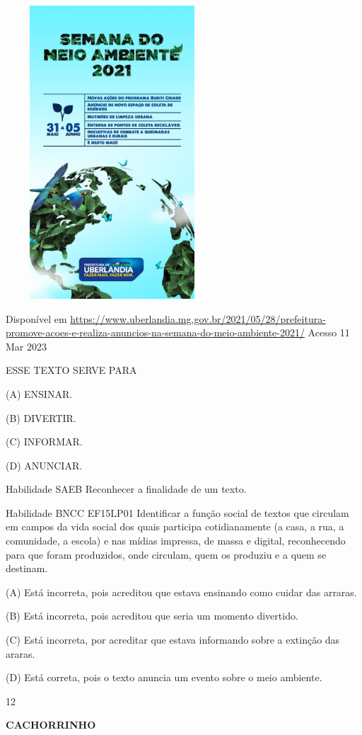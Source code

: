 {{{{{{\includegraphics[width=3.12674in,height=4.31210in]{media/image145.jpeg}

Disponível em
\url{https://www.uberlandia.mg.gov.br/2021/05/28/prefeitura-promove-acoes-e-realiza-anuncios-na-semana-do-meio-ambiente-2021/}
Acesso 11 Mar 2023

ESSE TEXTO SERVE PARA

(A) ENSINAR.

(B) DIVERTIR.

(C) INFORMAR.

(D) ANUNCIAR.

Habilidade SAEB Reconhecer a finalidade de um texto.

Habilidade BNCC EF15LP01 Identificar a função social de textos que
circulam em campos da vida social dos quais participa cotidianamente (a
casa, a rua, a comunidade, a escola) e nas mídias impressa, de massa e
digital, reconhecendo para que foram produzidos, onde circulam, quem os
produziu e a quem se destinam.

(A) Está incorreta, pois acreditou que estava ensinando como cuidar das
arraras.

(B) Está incorreta, pois acreditou que seria um momento divertido.

(C) Está incorreta, por acreditar que estava informando sobre a extinção
das araras.

(D) Está correta, pois o texto anuncia um evento sobre o meio ambiente.

\num{12}

\textbf{CACHORRINHO}

}}}}}}
